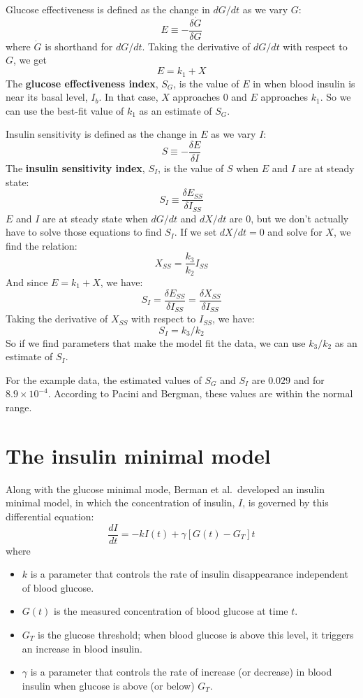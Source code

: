 \documentclass[12pt]{book}
\theoremstyle{exercise}
\begin{document}
Glucose effectiveness is defined as the change in $dG/dt$ as we vary $G$:
%
\[ E \equiv - \frac{\delta \dot{G}}{\delta G} \]
%
where $\dot{G}$ is shorthand for $dG/dt$.  Taking the derivative of $dG/dt$ with respect to $G$, we get
%
\[ E = k_1 + X \]
%
The {\bf glucose effectiveness index}, $S_G$, is the value of $E$ in when blood insulin is near its basal level, $I_b$.  In that case, $X$ approaches 0 and $E$ approaches $k_1$.  So we can use the best-fit value of $k_1$ as an estimate of $S_G$.

Insulin sensitivity is defined as the change in $E$ as we vary $I$:
%
\[ S \equiv - \frac{\delta E}{\delta I} \]
%
The {\bf insulin sensitivity index}, $S_I$, is the value of $S$ when $E$ and $I$ are at steady state:
%
\[ S_I \equiv \frac{\delta E_{SS}}{\delta I_{SS}} \]
%
$E$ and $I$ are at steady state when $dG/dt$ and $dX/dt$ are 0, but we don't actually have to solve those equations to find $S_I$.  If we set $dX/dt = 0$ and solve for $X$, we find the relation:
%
\[ X_{SS} = \frac{k_3}{k_2} I_{SS} \]
%
And since $E = k_1 + X$, we have:
%
\[ S_I = \frac{\delta E_{SS}}{\delta I_{SS}} = \frac{\delta X_{SS}}{\delta I_{SS}} \]
%
Taking the derivative of $X_{SS}$ with respect to $I_{SS}$, we have:
%
\[ S_I = k_3 / k_2 \]
%
So if we find parameters that make the model fit the data, we can use $k_3 / k_2$ as an estimate of $S_I$.  

For the example data, the estimated values of $S_G$ and $S_I$ are $0.029$ and for $8.9 \times 10^{-4}$.  According to Pacini and Bergman, these values are within the normal range.


\section{The insulin minimal model}

Along with the glucose minimal mode, Berman et al.~developed an insulin minimal model, in which the concentration of insulin, $I$, is governed by this differential equation:
%
\[ \frac{dI}{dt} = -k I(t) + \gamma \left[ G(t) - G_T \right] t \]
%
where

\begin{itemize}

\item $k$ is a parameter that controls the rate of insulin disappearance independent of blood glucose.   

\item $G(t)$ is the measured concentration of blood glucose at time $t$.

\item $G_T$ is the glucose threshold; when blood glucose is above this level, it triggers an increase in blood insulin. 

\item $\gamma$ is a parameter that controls the rate of increase (or decrease) in blood insulin when glucose is above (or below) $G_T$.


\end{itemize}
\end{document}
